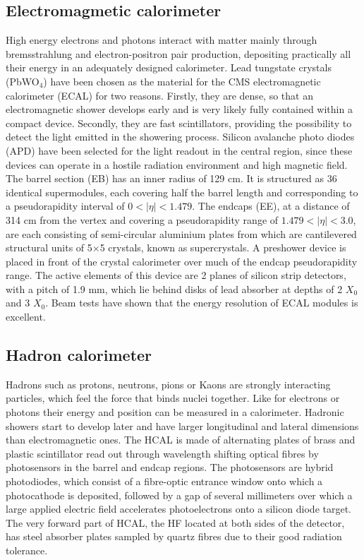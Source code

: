 \subsection{Electromagmetic calorimeter}
High energy electrons and photons interact with matter mainly through bremsstrahlung and electron-positron
pair production, depositing practically all their energy in an adequately designed calorimeter. Lead tungstate
crystals (PbWO$_{4}$) have been chosen as the material for the CMS electromagnetic calorimeter (ECAL) for two
reasons. Firstly, they are dense, so that an electromagnetic shower develops early and is very likely fully contained
within a compact device. Secondly, they are fast scintillators, providing the possibility to detect the light emitted
in the showering process. Silicon avalanche photo diodes (APD) have been selected for the light readout in the
central region, since these devices can operate in a hostile radiation environment and high magnetic field.
\newline The barrel section (EB) has an inner radius of 129 cm. It is structured as 36 identical supermodules,
each covering half the barrel length and corresponding to a pseudorapidity
interval of $0 < |\eta| < 1.479$. The endcaps (EE), at a distance of 314 cm from the vertex and covering a pseudorapidity
range of $1.479 < |\eta| < 3.0$, are each consisting of semi-circular aluminium
plates from which are cantilevered structural units of 5$\times$5 crystals, known as supercrystals. A preshower
device is placed in front of the crystal calorimeter over much of the endcap pseudorapidity
range. The active elements of this device are 2 planes of silicon strip detectors, with a pitch
of 1.9 mm, which lie behind disks of lead absorber at depths of 2 $X_{0}$ and 3 $X_{0}$.
Beam tests have shown that the energy resolution of ECAL modules is excellent.

\subsection{Hadron calorimeter}
Hadrons such as protons, neutrons, pions or Kaons are strongly interacting particles, which feel the force that
binds nuclei together. Like for electrons or photons their energy and position can be measured in a calorimeter.
Hadronic showers start to develop later and have larger longitudinal and lateral dimensions than electromagnetic
ones. The HCAL is made of alternating plates of brass and plastic scintillator read out through wavelength shifting optical fibres by
photosensors in the barrel and endcap regions. The photosensors are hybrid photodiodes, which consist of a fibre-optic entrance window onto which a photocathode is deposited, followed by a gap of several millimeters over which a large applied electric field accelerates photoelectrons onto a silicon diode target. The very forward
part of HCAL, the HF located at both sides of the detector, has steel absorber plates sampled by quartz fibres due to their good radiation tolerance.

